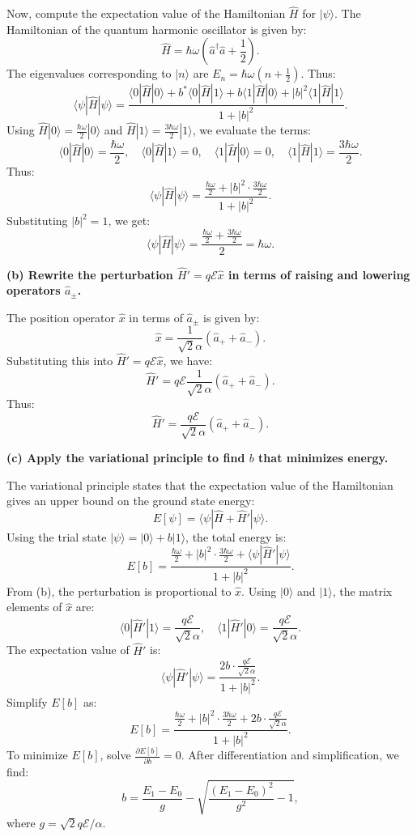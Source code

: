 \documentclass{article}
\begin{document}
Now, compute the expectation value of the Hamiltonian \(\hat{H}\) for \(|\psi\rangle\). The Hamiltonian of the quantum harmonic oscillator is given by:
\[
\hat{H} = \hbar\omega \left(\hat{a}^\dagger \hat{a} + \frac{1}{2}\right).
\]
The eigenvalues corresponding to \(|n\rangle\) are \(E_n = \hbar\omega\left(n + \frac{1}{2}\right)\). Thus:
\[
\langle \psi | \hat{H} | \psi \rangle = \frac{\langle 0 | \hat{H} | 0 \rangle + b^* \langle 0 | \hat{H} | 1 \rangle + b \langle 1 | \hat{H} | 0 \rangle + |b|^2 \langle 1 | \hat{H} | 1 \rangle}{1 + |b|^2}.
\]
Using \(\hat{H} |0\rangle = \frac{\hbar\omega}{2} |0\rangle\) and \(\hat{H} |1\rangle = \frac{3\hbar\omega}{2} |1\rangle\), we evaluate the terms:
\[
\langle 0 | \hat{H} | 0 \rangle = \frac{\hbar\omega}{2}, \quad \langle 0 | \hat{H} | 1 \rangle = 0, \quad \langle 1 | \hat{H} | 0 \rangle = 0, \quad \langle 1 | \hat{H} | 1 \rangle = \frac{3\hbar\omega}{2}.
\]
Thus:
\[
\langle \psi | \hat{H} | \psi \rangle = \frac{\frac{\hbar\omega}{2} + |b|^2 \cdot \frac{3\hbar\omega}{2}}{1 + |b|^2}.
\]
Substituting \(|b|^2 = 1\), we get:
\[
\langle \psi | \hat{H} | \psi \rangle = \frac{\frac{\hbar\omega}{2} + \frac{3\hbar\omega}{2}}{2} = \hbar\omega.
\]

\textbf{(b) Rewrite the perturbation \(\hat{H}' = q \mathcal{E} \hat{x}\) in terms of raising and lowering operators \(\hat{a}_\pm\).}

The position operator \(\hat{x}\) in terms of \(\hat{a}_\pm\) is given by:
\[
\hat{x} = \frac{1}{\sqrt{2} \alpha} (\hat{a}_+ + \hat{a}_-).
\]
Substituting this into \(\hat{H}' = q \mathcal{E} \hat{x}\), we have:
\[
\hat{H}' = q \mathcal{E} \frac{1}{\sqrt{2} \alpha} (\hat{a}_+ + \hat{a}_-).
\]
Thus:
\[
\hat{H}' = \frac{q \mathcal{E}}{\sqrt{2} \alpha} (\hat{a}_+ + \hat{a}_-).
\]

\textbf{(c) Apply the variational principle to find \(b\) that minimizes energy.}

The variational principle states that the expectation value of the Hamiltonian gives an upper bound on the ground state energy:
\[
E[\psi] = \langle \psi | \hat{H} + \hat{H}' | \psi \rangle.
\]
Using the trial state \(|\psi\rangle = |0\rangle + b |1\rangle\), the total energy is:
\[
E[b] = \frac{\frac{\hbar\omega}{2} + |b|^2 \cdot \frac{3\hbar\omega}{2} + \langle \psi | \hat{H}' | \psi \rangle}{1 + |b|^2}.
\]
From (b), the perturbation is proportional to \(\hat{x}\). Using \(|0\rangle\) and \(|1\rangle\), the matrix elements of \(\hat{x}\) are:
\[
\langle 0 | \hat{H}' | 1 \rangle = \frac{q \mathcal{E}}{\sqrt{2} \alpha}, \quad \langle 1 | \hat{H}' | 0 \rangle = \frac{q \mathcal{E}}{\sqrt{2} \alpha}.
\]
The expectation value of \(\hat{H}'\) is:
\[
\langle \psi | \hat{H}' | \psi \rangle = \frac{2 b \cdot \frac{q \mathcal{E}}{\sqrt{2} \alpha}}{1 + |b|^2}.
\]
Simplify \(E[b]\) as:
\[
E[b] = \frac{\frac{\hbar\omega}{2} + |b|^2 \cdot \frac{3\hbar\omega}{2} + 2b \cdot \frac{q \mathcal{E}}{\sqrt{2} \alpha}}{1 + |b|^2}.
\]
To minimize \(E[b]\), solve \(\frac{\partial E[b]}{\partial b} = 0\). After differentiation and simplification, we find:
\[
b = \frac{E_1 - E_0}{g} - \sqrt{\frac{(E_1 - E_0)^2}{g^2} - 1},
\]
where \(g = \sqrt{2} q \mathcal{E} / \alpha\).
\end{document}

